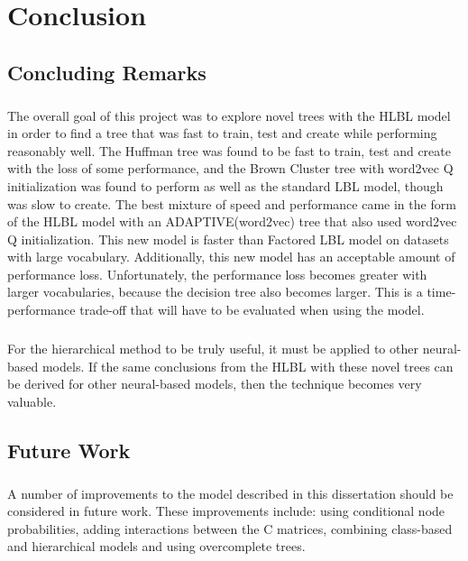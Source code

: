 
\chapter{Conclusion}

\section{Concluding Remarks}
\paragraph{}
The overall goal of this project was to explore novel trees with the HLBL model in order to find a tree that was fast to train, test and create while performing reasonably well. The Huffman tree was found to be fast to train, test and create with the loss of some performance, and the Brown Cluster tree with word2vec Q initialization was found to perform as well as the standard LBL model, though was slow to create. The best mixture of speed and performance came in the form of the HLBL model with an ADAPTIVE(word2vec) tree that also used word2vec Q initialization. This new model is faster than Factored LBL model on datasets with large vocabulary. Additionally, this new model has an acceptable amount of performance loss. Unfortunately, the performance loss becomes greater with larger vocabularies, because the decision tree also  becomes larger. This is a time-performance trade-off that will have to be evaluated when using the model.
\paragraph{}
For the hierarchical method to be truly useful, it must be applied to other neural-based models. If the same conclusions from the HLBL with these novel trees can be derived for other neural-based models, then the technique becomes very valuable.

\section{Future Work}
\paragraph{}
A number of improvements to the model described in this dissertation should be considered in future work.
These improvements include: using conditional node probabilities, adding interactions between the C matrices, combining class-based and hierarchical models and using overcomplete trees.
 
